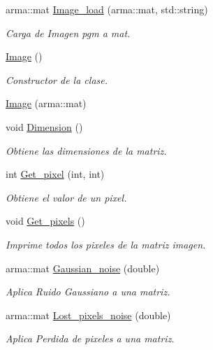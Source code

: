 \begin{DoxyCompactItemize}
\item 
arma::mat \hyperlink{classImage_adc137bf8699177ff23598709300ab091}{Image\_\-load} (arma::mat, std::string)
\begin{DoxyCompactList}\small\item\em Carga de Imagen pgm a mat. \end{DoxyCompactList}\item 
\hyperlink{classImage_a58edd1c45b4faeb5f789b0d036d02313}{Image} ()
\begin{DoxyCompactList}\small\item\em Constructor de la clase. \end{DoxyCompactList}\item 
\hyperlink{classImage_a2077a16b61e5d7612237c681975b8a1f}{Image} (arma::mat)
\item 
void \hyperlink{classImage_a900a9e62aa5bb9cc3c20c9d824a95ef3}{Dimension} ()
\begin{DoxyCompactList}\small\item\em Obtiene las dimensiones de la matriz. \end{DoxyCompactList}\item 
int \hyperlink{classImage_aa86aeeebf3fdc0a1a7d298e6162bca7d}{Get\_\-pixel} (int, int)
\begin{DoxyCompactList}\small\item\em Obtiene el valor de un pixel. \end{DoxyCompactList}\item 
void \hyperlink{classImage_a23162a663c28406dcf254696076ec204}{Get\_\-pixels} ()
\begin{DoxyCompactList}\small\item\em Imprime todos los pixeles de la matriz imagen. \end{DoxyCompactList}\item 
arma::mat \hyperlink{classImage_a61630c07f6e608502bb6f7656cb154d7}{Gaussian\_\-noise} (double)
\begin{DoxyCompactList}\small\item\em Aplica Ruido Gaussiano a una matriz. \end{DoxyCompactList}\item 
arma::mat \hyperlink{classImage_a7f129688b13d0d5e75d3c524fcd1e6bb}{Lost\_\-pixels\_\-noise} (double)
\begin{DoxyCompactList}\small\item\em Aplica Perdida de pixeles a una matriz. \end{DoxyCompactList}\item 

\end{DoxyCompactItemize}
